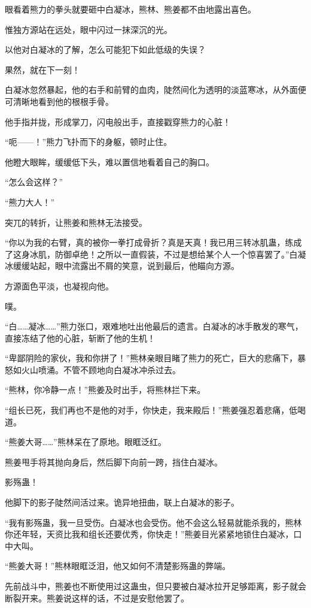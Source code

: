
\begin{this_body}

眼看着熊力的拳头就要砸中白凝冰，熊林、熊姜都不由地露出喜色。

惟独方源站在远处，眼中闪过一抹深沉的光。

以他对白凝冰的了解，怎么可能犯下如此低级的失误？

果然，就在下一刻！

白凝冰忽然暴起，他的右手和前臂的血肉，陡然间化为透明的淡蓝寒冰，从外面便可清晰地看到他的根根手骨。

他手指并拢，形成掌刀，闪电般出手，直接戳穿熊力的心脏！

“呃——！”熊力飞扑而下的身躯，顿时止住。

他瞪大眼眸，缓缓低下头，难以置信地看着自己的胸口。

“怎么会这样？”

“熊力大人！”

突兀的转折，让熊姜和熊林无法接受。

“你以为我的右臂，真的被你一拳打成骨折？真是天真！我已用三转冰肌蛊，练成了这身冰肌，防御卓绝！之所以一直假装，不过是想给某个人一个惊喜罢了。”白凝冰缓缓站起，眼中流露出不屑的笑意，说到最后，他瞄向方源。

方源面色平淡，也凝视向他。

噗。

“白……凝冰……”熊力张口，艰难地吐出他最后的遗言。白凝冰的冰手散发的寒气，直接冻结了他的心脏，斩断了他的生机！

“卑鄙阴险的家伙，我和你拼了！”熊林亲眼目睹了熊力的死亡，巨大的悲痛下，暴怒如火山喷涌。不管不顾地向白凝冰冲杀过去。

“熊林，你冷静一点！”熊姜及时出手，将熊林拦下来。

“组长已死，我们再也不是他的对手，你快走，我来殿后！”熊姜强忍着悲痛，低喝道。

“熊姜大哥……”熊林呆在了原地。眼眶泛红。

熊姜甩手将其抛向身后，然后脚下向前一跨，挡住白凝冰。

影殇蛊！

他脚下的影子陡然间活过来。诡异地扭曲，联上白凝冰的影子。

“我有影殇蛊，我一旦受伤。白凝冰也会受伤。他不会这么轻易就能杀我的，熊林你还年轻，天资比我和组长还要优秀，你快走！”熊姜目光紧紧地锁住白凝冰，口中大叫。

“熊姜大哥！”熊林眼眶泛泪，他又如何不清楚影殇蛊的弊端。

先前战斗中，熊姜也不断使用过这蛊虫，但只要被白凝冰拉开足够距离，影子就会断裂开来。熊姜说这样的话，不过是安慰他罢了。


\end{this_body}
